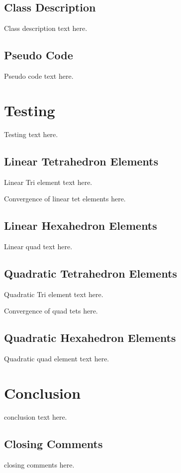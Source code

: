 \documentclass[a4paper, 12pt]{article}
\begin{document}
\subsection{Class Description} \label{subsec:class}
Class description text here.

\subsection{Pseudo Code} \label{subsec:pseudo}
Pseudo code text here.

\section{Testing} \label{sec:testing}
Testing text here.

\subsection{Linear Tetrahedron Elements} \label{subsec:linTet}
Linear Tri element text here.

Convergence of linear tet elements here.

\subsection{Linear Hexahedron Elements} \label{subsec:linHex}
Linear quad text here.

\subsection{Quadratic Tetrahedron Elements} \label{subsec:quadTet}
Quadratic Tri element text here.

Convergence of quad tets here.

\subsection{Quadratic Hexahedron Elements} \label{subsec:quadHex}
Quadratic quad element text here.

\section{Conclusion} \label{sec:conclusion}
conclusion text here.

\subsection{Closing Comments} \label{sec:comments}
closing comments here.
\end{document}
